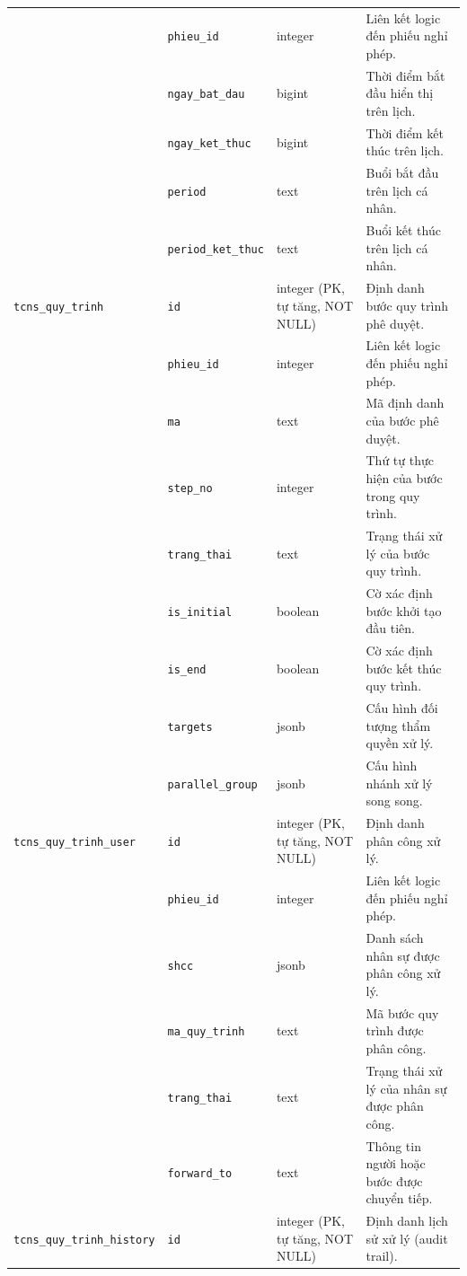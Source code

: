 \begin{xltabular}{\textwidth}{|L{2.7cm}|L{2.6cm}|L{4.2cm}|Y|}
 & \texttt{phieu\_id} & integer & Liên kết logic đến phiếu nghỉ phép. \\
 & \texttt{ngay\_bat\_dau} & bigint & Thời điểm bắt đầu hiển thị trên lịch. \\
 & \texttt{ngay\_ket\_thuc} & bigint & Thời điểm kết thúc trên lịch. \\
 & \texttt{period} & text & Buổi bắt đầu trên lịch cá nhân. \\
 & \texttt{period\_ket\_thuc} & text & Buổi kết thúc trên lịch cá nhân. \\
\hline
\texttt{tcns\_quy\_trinh} & \texttt{id} & integer (PK, tự tăng, NOT NULL) & Định danh bước quy trình phê duyệt. \\
 & \texttt{phieu\_id} & integer & Liên kết logic đến phiếu nghỉ phép. \\
 & \texttt{ma} & text & Mã định danh của bước phê duyệt. \\
 & \texttt{step\_no} & integer & Thứ tự thực hiện của bước trong quy trình. \\
 & \texttt{trang\_thai} & text & Trạng thái xử lý của bước quy trình. \\
 & \texttt{is\_initial} & boolean & Cờ xác định bước khởi tạo đầu tiên. \\
 & \texttt{is\_end} & boolean & Cờ xác định bước kết thúc quy trình. \\
 & \texttt{targets} & jsonb & Cấu hình đối tượng thẩm quyền xử lý. \\
 & \texttt{parallel\_group} & jsonb & Cấu hình nhánh xử lý song song. \\
\hline
\texttt{tcns\_quy\_trinh\_user} & \texttt{id} & integer (PK, tự tăng, NOT NULL) & Định danh phân công xử lý. \\
 & \texttt{phieu\_id} & integer & Liên kết logic đến phiếu nghỉ phép. \\
 & \texttt{shcc} & jsonb & Danh sách nhân sự được phân công xử lý. \\
 & \texttt{ma\_quy\_trinh} & text & Mã bước quy trình được phân công. \\
 & \texttt{trang\_thai} & text & Trạng thái xử lý của nhân sự được phân công. \\
 & \texttt{forward\_to} & text & Thông tin người hoặc bước được chuyển tiếp. \\
\hline
\texttt{tcns\_quy\_trinh\_history} & \texttt{id} & integer (PK, tự tăng, NOT NULL) & Định danh lịch sử xử lý (audit trail). \\

\end{xltabular}
